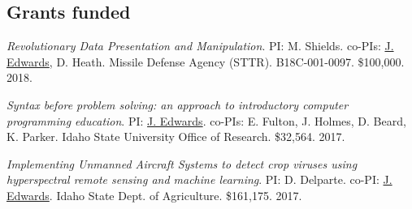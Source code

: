 \documentclass[margin,line]{res}
\begin{document}
\begin{resume}
%




\section{\sc Grants funded}
\textit{Revolutionary Data Presentation and Manipulation}. PI: M. Shields. co-PIs: \underline{J. Edwards}, D. Heath. Missile Defense Agency (STTR). B18C-001-0097. \$100,000. 2018.

\textit{Syntax before problem solving: an approach to introductory computer programming education}. PI: \underline{J. Edwards}. co-PIs: E. Fulton, J. Holmes, D. Beard, K. Parker. Idaho State University Office of Research. \$32,564. 2017.

\textit{Implementing Unmanned Aircraft Systems to detect crop viruses using hyperspectral remote sensing and machine learning}. PI: D. Delparte. co-PI: \underline{J. Edwards}. Idaho State Dept. of Agriculture. \$161,175. 2017.


\end{resume}
\end{document}
